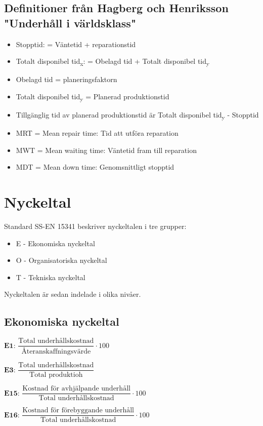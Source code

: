 	
	\subsection*{Definitioner från Hagberg och Henriksson "Underhåll i världsklass"}
	
\begin{itemize}	
	\item Stopptid: = Väntetid + reparationstid
	\item Totalt disponibel tid\textsubscript{x}: = Obelagd tid + Totalt disponibel tid\textsubscript{y}
	\item Obelagd tid = planeringsfaktorn
	\item Totalt disponibel tid\textsubscript{y} = Planerad produktionstid
	\item Tillgänglig tid av planerad produktionstid är Totalt disponibel tid\textsubscript{y} - Stopptid
	\item MRT = Mean repair time: Tid att utföra reparation
	\item MWT = Mean waiting time: Väntetid fram till reparation
	\item MDT = Mean down time: Genomsnittligt stopptid
\end{itemize}	
	

	\section*{Nyckeltal}
	Standard SS-EN 15341 beskriver nyckeltalen i tre grupper:
	\begin{itemize}
	 \item E - Ekonomiska nyckeltal
	 \item O - Organisatoriska nyckeltal
	 \item T - Tekniska nyckeltal
	\end{itemize}
Nyckeltalen är sedan indelade i olika nivåer.
\subsection*{Ekonomiska nyckeltal}
		$\textbf{E1: } \dfrac{\text{Total underhållskostnad}}{\text{Återanskaffningsvärde}} \cdot 100$
			
		$\textbf{E3: } \dfrac{\text{Total underhållskostnad}}{\text{Total produktioh}}$

		$\textbf{E15: } \dfrac{\text{Kostnad för avhjälpande underhåll}}{\text{Total underhållskostnad}} \cdot 100$

		$\textbf{E16: } \dfrac{\text{Kostnad för förebyggande underhåll}}{\text{Total underhållskostnad}} \cdot 100$

